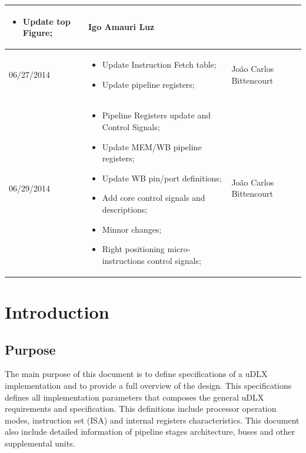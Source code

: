 \documentclass{article}
\begin{document}
\begin{center}
\begin{longtable}[pos]{|m{2cm} | m{7.2cm} | m{3.8cm}|}
\begin{itemize}
          \item Update top Figure;
        \end{itemize} & \small Igo Amauri Luz \\ \hline      
      \small 06/27/2014 & \small     \begin{itemize}
          \item Update Instruction Fetch table;
          \item Update pipeline registers;
        \end{itemize} & \small João Carlos Bittencourt \\ \hline      
      \small 06/29/2014 & \small     \begin{itemize}
          \item Pipeline Registers update and Control Signals;
          \item Update MEM/WB pipeline registers;
          \item Update WB pin/port definitions;
          \item Add core control signals and descriptions;
          \item Minnor changes;
          \item Right positioning micro-instructions control signals;
      \end{itemize} & \small João Carlos Bittencourt \\ \hline      
    \end{longtable}
  \end{center}

  \newpage
  
  \tableofcontents
  \newpage

  \section{Introduction}
  \subsection{Purpose}
  The main purpose of this document is to define specifications of a uDLX implementation and to provide a full overview of the design. This specifications defines all implementation parameters that composes the general uDLX requirements and specification. This definitions include processor operation modes, instruction set (ISA) and internal registers characteristics. This document also include detailed information of pipeline stages architecture, buses and other supplemental units.
\end{document}
